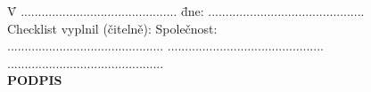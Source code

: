     \vskip0.2in
    \begin{tabbing}
	\hspace{0em} \= V .............................................  \hspace{6em} \= dne: ............................................. \\[0.5cm]
	\> Checklist vyplnil (čitelně):   \> Společnost:  \\[0.5cm]
    \> .............................................   \> .............................................  \\[1.5cm]
	\>   \> .............................................  \\[0.2cm]
	\hspace{25em} \= \textbf{PODPIS} \\
	\end{tabbing}

